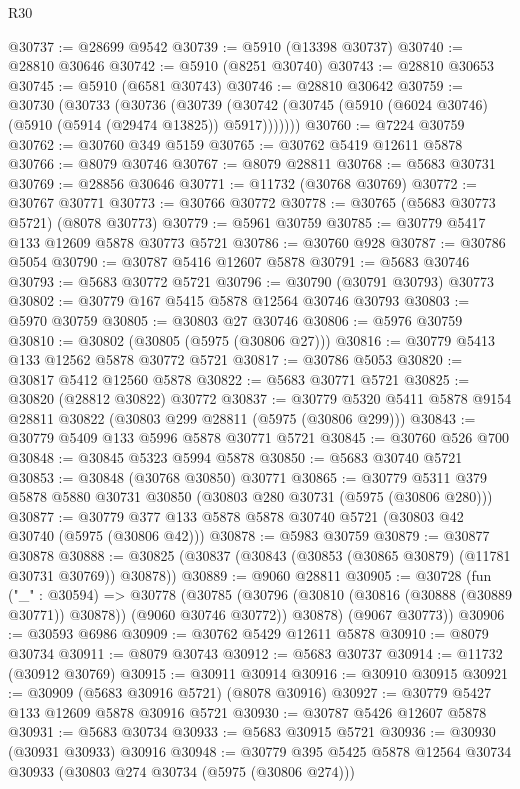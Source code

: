 \begin{lexlean}{R30}
\begin{coremodule}
@30737 := @28699 @9542
@30739 := @5910 (@13398 @30737)
@30740 := @28810 @30646
@30742 := @5910 (@8251 @30740)
@30743 := @28810 @30653
@30745 := @5910 (@6581 @30743)
@30746 := @28810 @30642
@30759 := @30730
    (@30733
      (@30736
        (@30739 (@30742 (@30745 (@5910 (@6024 @30746) (@5910 (@5914 (@29474 @13825)) @5917)))))))
@30760 := @7224 @30759
@30762 := @30760 @349 @5159
@30765 := @30762 @5419 @12611 @5878
@30766 := @8079 @30746
@30767 := @8079 @28811
@30768 := @5683 @30731
@30769 := @28856 @30646
@30771 := @11732 (@30768 @30769)
@30772 := @30767 @30771
@30773 := @30766 @30772
@30778 := @30765 (@5683 @30773 @5721) (@8078 @30773)
@30779 := @5961 @30759
@30785 := @30779 @5417 @133 @12609 @5878 @30773 @5721
@30786 := @30760 @928
@30787 := @30786 @5054
@30790 := @30787 @5416 @12607 @5878
@30791 := @5683 @30746
@30793 := @5683 @30772 @5721
@30796 := @30790 (@30791 @30793) @30773
@30802 := @30779 @167 @5415 @5878 @12564 @30746 @30793
@30803 := @5970 @30759
@30805 := @30803 @27 @30746
@30806 := @5976 @30759
@30810 := @30802 (@30805 (@5975 (@30806 @27)))
@30816 := @30779 @5413 @133 @12562 @5878 @30772 @5721
@30817 := @30786 @5053
@30820 := @30817 @5412 @12560 @5878
@30822 := @5683 @30771 @5721
@30825 := @30820 (@28812 @30822) @30772
@30837 := @30779 @5320 @5411 @5878 @9154 @28811 @30822 (@30803 @299 @28811 (@5975 (@30806 @299)))
@30843 := @30779 @5409 @133 @5996 @5878 @30771 @5721
@30845 := @30760 @526 @700
@30848 := @30845 @5323 @5994 @5878
@30850 := @5683 @30740 @5721
@30853 := @30848 (@30768 @30850) @30771
@30865 := @30779 @5311 @379 @5878 @5880 @30731 @30850 (@30803 @280 @30731 (@5975 (@30806 @280)))
@30877 := @30779 @377 @133 @5878 @5878 @30740 @5721 (@30803 @42 @30740 (@5975 (@30806 @42)))
@30878 := @5983 @30759
@30879 := @30877 @30878
@30888 := @30825 (@30837 (@30843 (@30853 (@30865 @30879) (@11781 @30731 @30769)) @30878))
@30889 := @9060 @28811
@30905 := @30728
    (fun ("_" : @30594) =>
    @30778
      (@30785
        (@30796 (@30810 (@30816 (@30888 (@30889 @30771)) @30878)) (@9060 @30746 @30772))
        @30878)
      (@9067 @30773))
@30906 := @30593 @6986
@30909 := @30762 @5429 @12611 @5878
@30910 := @8079 @30734
@30911 := @8079 @30743
@30912 := @5683 @30737
@30914 := @11732 (@30912 @30769)
@30915 := @30911 @30914
@30916 := @30910 @30915
@30921 := @30909 (@5683 @30916 @5721) (@8078 @30916)
@30927 := @30779 @5427 @133 @12609 @5878 @30916 @5721
@30930 := @30787 @5426 @12607 @5878
@30931 := @5683 @30734
@30933 := @5683 @30915 @5721
@30936 := @30930 (@30931 @30933) @30916
@30948 := @30779 @395 @5425 @5878 @12564 @30734 @30933 (@30803 @274 @30734 (@5975 (@30806 @274)))

\end{coremodule}
\end{lexlean}
